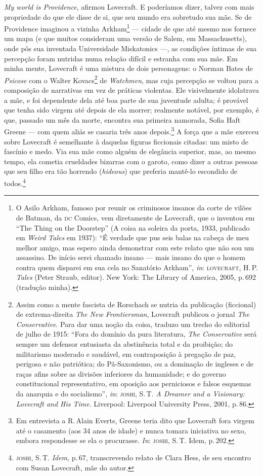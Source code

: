 \emph{My world is Providence}, afirmou Lovecraft. E poderíamos dizer,
talvez com mais propriedade do que ele disse de si, que seu mundo era
sobretudo sua mãe. Se de Providence imaginou a vizinha Arkham\footnote{O
  Asilo Arkham, famoso por reunir os criminosos insanos da corte de
  vilões de Batman, da \textsc{dc} Comics, vem diretamente de Lovecraft, que o
  inventou em ``The Thing on the Doorstep'' (A coisa na soleira da porta, 1933, publicado em
  \emph{Weird Tales} em 1937): ``É verdade que pus seis balas na cabeça
  de meu melhor amigo, mas espero ainda demonstrar com este relato que
  não sou um assassino. De início serei chamado insano --- mais insano
  do que o homem contra quem disparei em sua cela no Sanatório Arkham'',
  \emph{in}: \textsc{lovecraft}, H.\,P. \emph{Tales} (Peter Straub, editor). New
  York: The Library of America, 2005, p.\,692 (tradução minha).} ---
cidade de que até mesmo nos fornece um mapa (e que muitos consideram uma
versão de Salem, em Massachusetts), onde pôs sua inventada Universidade
Miskatonics ---, as condições íntimas de sua percepção foram nutridas
numa relação difícil e estranha com sua mãe. Em minha mente, Lovecraft é
uma mistura de dois personagens: o Norman Bates de \emph{Psicose} com o
Walter Kovacs\footnote{Assim como a mente fascista de Rorschach se
  nutria da publicação (ficcional) de extrema-direita \emph{The New
  Frontiersman}, Lovecraft publicou o jornal \emph{The Conservative}.
  Para dar uma noção da coisa, traduzo um trecho do editorial de
  julho de 1915: ``Fora do domínio da pura literatura, \emph{The
  Conservative} será sempre um defensor entusiasta da abstinência total
  e da proibição; do militarismo moderado e saudável, em contraposição à
  pregação de paz, perigosa e não patriótica; do Pã-Saxonismo, ou a
  dominação de ingleses e de raças afins sobre as divisões inferiores da
  humanidade; e do governo constitucional representativo, em oposição
  aos perniciosos e falsos esquemas da anarquia e do socialismo'',
  \emph{in}: \textsc{joshi}, S.\,T. \emph{A Dreamer and a Visionary: Lovecraft and
  His Time}. Liverpool: Liverpool University Press, 2001, p.\,86.} de
\emph{Watchmen}, mas cuja percepção se voltou para a composição de
narrativas em vez de práticas violentas. Ele visivelmente idolatrava a
mãe, e foi dependente dela até boa parte de sua juventude adulta; é
provável que tenha sido virgem até depois de ela morrer; realmente
notável, por exemplo, é que, passado um mês da morte, encontra sua
primeira namorada, Sofia Haft Greene --- com quem aliás se casaria três
anos depois.\footnote{Em entrevista a R.\,Alain Everts, Greene teria dito
  que Lovecraft fora virgem até o casamento (aos 34 anos de idade) e
  nunca tomara iniciativa no sexo, embora respondesse se ela o
  procurasse. \emph{In}: \textsc{joshi}, S.\,T. Idem, p.\,202.} A força que a mãe
exerceu sobre Lovecraft é semelhante à daquelas figuras ficcionais
citadas: um misto de fascínio e medo. Via sua mãe como alguém de
elegância superior, mas, ao mesmo tempo, ela cometia crueldades bizarras
com o garoto, como dizer a outras pessoas que seu filho era tão horrendo
(\emph{hideous}) que preferia mantê-lo escondido de todos.\footnote{\textsc{joshi}, S.\,T. \emph{Idem}, p.\,67, transcrevendo relato de Clara Hess, de seu
  encontro com Susan Lovecraft, mãe do autor.}

